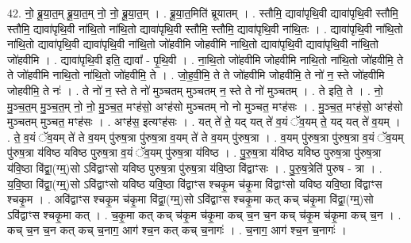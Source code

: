 \documentclass[17pt]{extarticle}
\begin{document}
42. नो॒ ब्रू॒या॒त॒म् ब्रू॒या॒त॒म् नो॒ नो॒ ब्रू॒या॒त॒म् । . ब्रू॒या॒त॒मिति॑ ब्रूयातम् । . स्तौमि॒ द्यावा॑पृथि॒वी द्यावा॑पृथि॒वी स्तौमि॒ स्तौमि॒ द्यावा॑पृथि॒वी ना॑थि॒तो ना॑थि॒तो द्यावा॑पृथि॒वी स्तौमि॒ स्तौमि॒ द्यावा॑पृथि॒वी ना॑थि॒तः । . द्यावा॑पृथि॒वी ना॑थि॒तो ना॑थि॒तो द्यावा॑पृथि॒वी द्यावा॑पृथि॒वी ना॑थि॒तो जो॑हवीमि जोहवीमि नाथि॒तो द्यावा॑पृथि॒वी द्यावा॑पृथि॒वी ना॑थि॒तो जो॑हवीमि । . द्यावा॑पृथि॒वी इति॒ द्यावा᳚ - पृ॒थि॒वी । . ना॒थि॒तो जो॑हवीमि जोहवीमि नाथि॒तो ना॑थि॒तो जो॑हवीमि॒ ते ते जो॑हवीमि नाथि॒तो ना॑थि॒तो जो॑हवीमि॒ ते । . जो॒ह॒वी॒मि॒ ते ते जो॑हवीमि जोहवीमि॒ ते नो॑ न॒ स्ते जो॑हवीमि जोहवीमि॒ ते नः॑ । . ते नो॑ न॒ स्ते ते नो॑ मुञ्चतम् मुञ्चतम् न॒ स्ते ते नो॑ मुञ्चतम् । . ते इति॒ ते । . नो॒ मु॒ञ्च॒त॒म् मु॒ञ्च॒त॒म् नो॒ नो॒ मु॒ञ्च॒त॒ मꣳह॑सो॒ अꣳह॑सो मुञ्चतम् नो नो मुञ्चत॒ मꣳह॑सः । . मु॒ञ्च॒त॒ मꣳह॑सो॒ अꣳह॑सो मुञ्चतम् मुञ्चत॒ मꣳह॑सः । . अꣳह॑स॒ इत्यꣳह॑सः । . यत् ते॑ ते॒ यद् यत् ते॑ व॒यं ॅव॒यम् ते॒ यद् यत् ते॑ व॒यम् । . ते॒ व॒यं ॅव॒यम् ते॑ ते व॒यम् पु॑रुष॒त्रा पु॑रुष॒त्रा व॒यम् ते॑ ते व॒यम् पु॑रुष॒त्रा । . व॒यम् पु॑रुष॒त्रा पु॑रुष॒त्रा व॒यं ॅव॒यम् पु॑रुष॒त्रा य॑विष्ठ यविष्ठ पुरुष॒त्रा व॒यं ॅव॒यम् पु॑रुष॒त्रा य॑विष्ठ । . पु॒रु॒ष॒त्रा य॑विष्ठ यविष्ठ पुरुष॒त्रा पु॑रुष॒त्रा य॑वि॒ष्ठा वि॑द्वा॒(ग्म्॒)सो ऽवि॑द्वाꣳसो यविष्ठ पुरुष॒त्रा पु॑रुष॒त्रा य॑वि॒ष्ठा वि॑द्वाꣳसः । . पु॒रु॒ष॒त्रेति॑ पुरुष - त्रा । . य॒वि॒ष्ठा वि॑द्वा॒(ग्म्॒)सो ऽवि॑द्वाꣳसो यविष्ठ यवि॒ष्ठा वि॑द्वाꣳस श्चकृ॒म च॑कृ॒मा वि॑द्वाꣳसो यविष्ठ यवि॒ष्ठा वि॑द्वाꣳस श्चकृ॒म । . अवि॑द्वाꣳस श्चकृ॒म च॑कृ॒मा वि॑द्वा॒(ग्म्॒)सो ऽवि॑द्वाꣳस श्चकृ॒मा कत् कच् च॑कृ॒मा वि॑द्वा॒(ग्म्॒)सो ऽवि॑द्वाꣳस श्चकृ॒मा कत् । . च॒कृ॒मा कत् कच् च॑कृ॒म च॑कृ॒मा कच् च॒न च॒न कच् च॑कृ॒म च॑कृ॒मा कच् च॒न । . कच् च॒न च॒न कत् कच् च॒नाग॒ आग॑ श्च॒न कत् कच् च॒नागः॑ । . च॒नाग॒ आग॑ श्च॒न च॒नागः॑ । \newline
\pagebreak
{}
\end{document}
